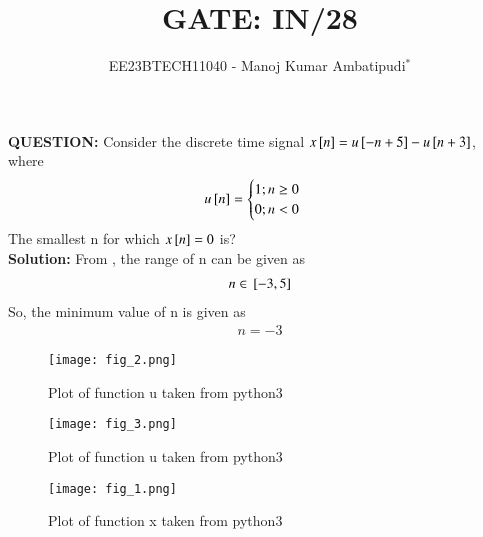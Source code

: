 \documentclass[journal,12pt,twocolumn]{IEEEtran}
\theoremstyle{remark}
\begin{document}

\vspace{3cm}
\title{GATE: IN/28}
\author{EE23BTECH11040 - Manoj Kumar Ambatipudi$^{*}$%
}
\maketitle
\newpage
\bigskip
\renewcommand{\thefigure}{\theenumi}
\renewcommand{\thetable}{\theenumi}
\textbf{QUESTION:}
Consider the discrete time signal $x{}\left[n\right] = u{}\left[-n+5\right] - u{}\left[n+3\right]$, where
\[u{}\left[n\right] = 
\begin{cases}
    1;n\geq0\\
    0;n<0
\end{cases}
\]
The smallest n for which $x{}\left[n\right] = 0$ is?\\
\textbf{Solution:}
From , the range of n can be given as 
\begin{align}
    n \in {}\left[-3,5\right]
\end{align}
So, the minimum value of n is given as 
\begin{align}
    n = -3
\end{align}
\begin{figure}[h!]
\renewcommand\thefigure{1}
    \centering
    \texttt{[image: fig\_2.png]}
    \caption{Plot of function u taken from python3}
    \label{IN/28/fig2}
\end{figure}
\begin{figure}[h!]
\renewcommand\thefigure{2}
    \centering
    \texttt{[image: fig\_3.png]}
    \caption{Plot of function u taken from python3}
    \label{IN/28/fig3}
\end{figure}
\begin{figure}[h!]
\renewcommand\thefigure{3}
    \centering
    \texttt{[image: fig\_1.png]}
    \caption{Plot of function x taken from python3}
    \label{IN/28/fig1}
\end{figure}
\end{document}
